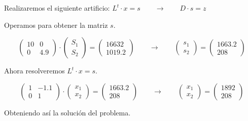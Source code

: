 \begin{frame}
\begin{solution}
\begin{enumerate}[d)]
			      Realizaremos el siguiente artificio:
			      $L^{t}\cdot x=s \qquad \longrightarrow \qquad D\cdot s=z$

			      Operamos para obtener la matriz $s$.

			      \begin{equation*}
				      \begin{pmatrix}
					      10 & 0   \\
					      0  & 4.9
				      \end{pmatrix}
				      \cdot
				      \begin{pmatrix}
					      S_{1} \\
					      S_{2}
				      \end{pmatrix}
				      =
				      \begin{pmatrix}
					      16632 \\
					      1019.2
				      \end{pmatrix}
				      \qquad
				      \longrightarrow
				      \qquad
				      \begin{pmatrix}
					      s_{1} \\
					      s_{2}
				      \end{pmatrix}
				      =
				      \begin{pmatrix}
					      1663.2 \\
					      208
				      \end{pmatrix}
			      \end{equation*}

			      Ahora resolveremos $L^{t}\cdot x=s$.

			      \begin{equation*}
				      \begin{pmatrix}
					      1 & -1.1 \\
					      0 & 1
				      \end{pmatrix}
				      \cdot
				      \begin{pmatrix}
					      x_{1} \\
					      x_{2}
				      \end{pmatrix}
				      =
				      \begin{pmatrix}
					      1663.2 \\
					      208
				      \end{pmatrix}
				      \qquad
				      \longrightarrow
				      \qquad
				      \begin{pmatrix}
					      x_{1} \\
					      x_{2}
				      \end{pmatrix}
				      =
				      \begin{pmatrix}
					      1892 \\
					      208
				      \end{pmatrix}
			      \end{equation*}

			      Obteniendo así la solución del problema.

		\end{enumerate}
	\end{solution}
\end{frame}

